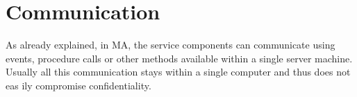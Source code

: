


\section{Communication}
\begin{sloppypar}
    As already explained, in MA, the service components can communicate using 
    events, procedure calls or other methods available within a single server 
    machine. Usually all this communication stays within a single computer and 
    thus does not eas
    ily compromise confidentiality.
\end{sloppypar}
\begin{sloppypar}
    
\end{sloppypar}






